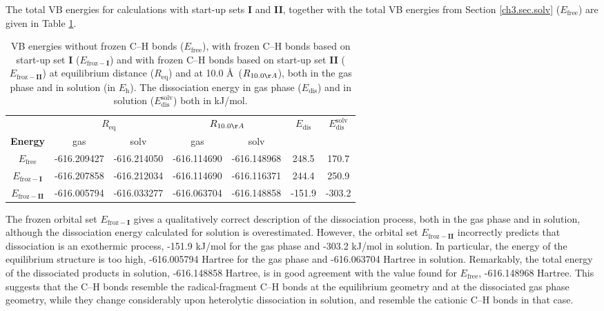 The total VB energies for calculations with start-up sets \textbf{I} and \textbf{II}, together with the total VB energies from Section \ref{ch3.sec.solv} ($E_\mathrm{free}$) are given in Table \ref{ch3.tab.frozen}. 
\begin{table}[htp]
\center
\caption{VB energies without frozen C--H bonds ($E_\mathrm{free}$), with frozen C--H bonds based on
start-up set \textbf{I} ($E_\mathrm{froz-\textbf{I}}$) and with frozen C--H bonds based on start-up set \textbf{II}
($E_\mathrm{froz-\textbf{II}}$) at equilibrium distance ($R_\mathrm{eq}$) and at 10.0 \AA\ ($R_{10.0 \AA}$),
both in the gas phase and in solution (in $E_\mathrm{h}$). The dissociation energy in gas phase ($E_\mathrm{dis}$) and in solution ($E_\mathrm{dis}^\mathrm{solv}$) both in kJ/mol.}
\center
\begin{tabular}{|c|cc|cc|c|c|}
\hline
&\multicolumn{2}{c|}{$R_\mathrm{eq}$}&\multicolumn{2}{c|}{$R_{10.0 \AA}$} & $E_\mathrm{dis}$ & $E_\mathrm{dis}^\mathrm{solv}$ \\
\textbf{Energy} & gas & solv & gas & solv &&\\
\hline
$E_\mathrm{free}$      & -616.209427 & -616.214050 & -616.114690 & -616.148968 & 248.5 & 170.7 \\
$E_\mathrm{froz-\textbf{I}}$& -616.207858 & -616.212034 & -616.114690 & -616.116371 & 244.4 & 250.9 \\
$E_\mathrm{froz-\textbf{II}}$& -616.005794 & -616.033277 & -616.063704 & -616.148858 & -151.9 & -303.2 \\
\hline
\end{tabular}
\label{ch3.tab.frozen}
\end{table}

The frozen orbital set $E_{\mathrm{froz}-\textbf{I}}$ gives a qualitatively correct description of the dissociation process, both in the gas phase and in solution, although the dissociation energy calculated for solution is overestimated.  However, the orbital set $E_{\mathrm{froz}-\textbf{II}}$ incorrectly predicts that dissociation is an exothermic process, \mbox{-151.9} kJ/mol for the gas phase and \mbox{-303.2} kJ/mol in solution.  In particular, the energy of the equilibrium structure is too high, \mbox{-616.005794} Hartree for the gas phase and \mbox{-616.063704} Hartree in solution.  Remarkably, the total energy of the dissociated products in solution, \mbox{-616.148858} Hartree, is in good agreement with the value found for $E_{\mathrm{free}}$, \mbox{-616.148968} Hartree. This suggests that the C--H bonds resemble the radical-fragment C--H bonds at the equilibrium geometry and at the dissociated gas phase geometry, while they change considerably upon heterolytic dissociation in solution, and resemble the cationic C--H bonds in that case.

